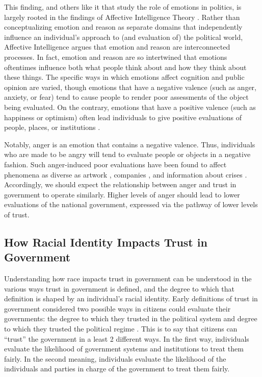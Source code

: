 \documentclass[12t, letterpaper]{article}
\begin{document}
This finding, and others like it that study the role of emotions in politics, is largely rooted in the findings of Affective Intelligence Theory \citep{marcus_etal2000}. Rather than conceptualizing emotion and reason as separate domains that independently influence an individual's approach to (and evaluation of) the political world, Affective Intelligence argues that emotion and reason are interconnected processes. In fact, emotion and reason are so intertwined that emotions oftentimes influence both what people think about and how they think about these things. The specific ways in which emotions affect cognition and public opinion are varied, though emotions that have a negative valence (such as anger, anxiety, or fear) tend to cause people to render poor assessments of the object being evaluated. On the contrary, emotions that have a positive valence (such as happiness or optimism) often lead individuals to give positive evaluations of people, places, or institutions \citep{bower1991}.

Notably, anger is an emotion that contains a negative valence. Thus, individuals who are made to be angry will tend to evaluate people or objects in a negative fashion. Such anger-induced poor evaluations have been found to affect phenomena as diverse as artwork \citep{silvia2009looking}, companies \citep{bennett1997anger}, and information about crises \citep{kim2011emotions}. Accordingly, we should expect the relationship between anger and trust in government to operate similarly. Higher levels of anger should lead to lower evaluations of the national government, expressed via the pathway of lower levels of trust.

\subsection{How Racial Identity Impacts Trust in Government}
\label{subsec:racetrust}

Understanding how race impacts trust in government can be understood in the various ways trust in government is defined, and the degree to which that definition is shaped by an individual's racial identity. Early definitions of trust in government considered two possible ways in citizens could evaluate their governments: the degree to which they trusted in the political system and degree to which they trusted the political regime \citep{easton1965}. This is to say that citizens can ``trust'' the government in a least 2 different ways. In the first way, individuals evaluate the likelihood of government systems and institutions to treat them fairly. In the second meaning, individuals evaluate the likelihood of the individuals and parties in charge of the government to treat them fairly. 
\end{document}
